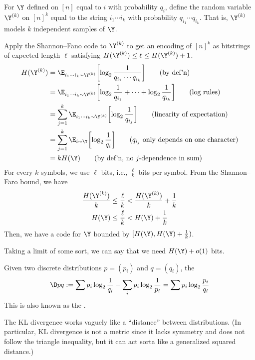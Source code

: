 \documentclass[class=co432,notes,tikz]{agony}
\begin{document}
\begin{sol}[batching]
  For $\Y$ defined on $[n]$ equal to $i$ with probability $q_i$,
  define the random variable $\Y^{(k)}$ on $[n]^k$
  equal to the string $i_1\cdots i_k$ with probability $q_{i_1}\cdots q_{i_k}$.
  That is, $\Y^{(k)}$ models $k$ independent samples of $\Y$.

  Apply the Shannon--Fano code to $\Y^{(k)}$
  to get an encoding of $[n]^k$ as bitstrings of expected length $\ell$
  satisfying $H(\Y^{(k)}) \leq \ell \leq H(\Y^{(k)}) + 1$.
  \begin{align*}
    H(\Y^{(k)}) & = \E_{i_1\cdots i_k \sim \Y^{(k)}}\qty[\log_2 \frac{1}{q_{i_1}\cdots q_{i_k}}] \tag{by def'n}                       \\
                & = \E_{i_1\cdots i_k \sim \Y^{(k)}}\qty[\log_2 \frac{1}{q_{i_1}} + \dotsb + \log_2\frac{1}{q_{i_k}}] \tag{log rules} \\
                & = \sum_{j=1}^k \E_{i_1\cdots i_k \sim \Y^{(k)}}\qty[\log_2 \frac{1}{q_{i_j}}] \tag{linearity of expectation}        \\
                & = \sum_{j=1}^k \E_{i \sim \Y}\qty[\log_2 \frac{1}{q_{i}}] \tag{$q_{i_j}$ only depends on one character}             \\
                & = kH(\Y) \tag{by def'n, no $j$-dependence in sum}
  \end{align*}
  For every $k$ symbols, we use $\ell$ bits, i.e., $\frac{\ell}{k}$ bits per symbol.
  From the Shannon--Faro bound, we have
  \begin{align*}
    \frac{H(\Y^{(k)})}{k} & \leq \frac{\ell}{k} < \frac{H(\Y^{(k)})}{k} + \frac{1}{k} \\
    H(\Y)                 & \leq \frac{\ell}{k} < H(\Y) + \frac{1}{k}
  \end{align*}
  Then, we have a code for $\Y$ bounded by
  $[H(\Y), H(\Y) + \frac{1}{k})$.

  Taking a limit of some sort, we can say that we need $H(\Y) + o(1)$ bits.
\end{sol}

\begin{defn*}
  Given two discrete distributions $p = (p_i)$ and $q = (q_i)$,
  the 
  \[ \D p q :=
    \sum p_i \log_2\frac{1}{q_i} - \sum_i p_i \log_2 \frac{1}{p_i}
    = \sum p_i \log_2 \frac{p_i}{q_i} \]
  This is also known as the .
\end{defn*}

The KL divergence works vaguely like a ``distance'' between distributions.
(In particular, KL divergence is not a metric since it lacks symmetry
and does not follow the triangle inequality,
but it can act sorta like a generalized squared distance.)
\end{document}
